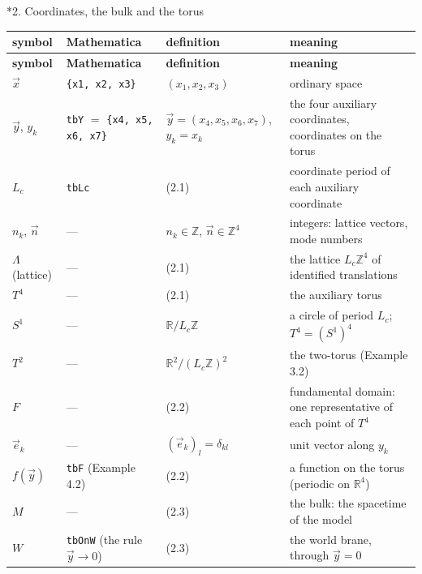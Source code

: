 \documentclass[10pt,a4paper]{article}
\makeatletter
\renewcommand\section{\@startsection{section}{1}{\z@}{-3.5ex \@plus -1ex \@minus -.2ex}{2.3ex \@plus.2ex}{\normalfont\Large\bfseries\raggedright}}
\makeatother
\begin{document}
\section*{2. Coordinates, the bulk and the torus}
{\small
\begin{longtable}{>{\raggedright\arraybackslash}p{}>{\raggedright\arraybackslash}p{}>{\raggedright\arraybackslash}p{}>{\raggedright\arraybackslash}p{}}
\toprule
\textbf{symbol} & \textbf{Mathematica} & \textbf{definition} & \textbf{meaning} \\
\midrule\endfirsthead
\toprule
\textbf{symbol} & \textbf{Mathematica} & \textbf{definition} & \textbf{meaning} \\
\midrule\endhead
\endfoot
\bottomrule\endlastfoot
$\vec x$ & \texttt{\{x1, x2, x3\}} & $(x_1,x_2,x_3)$ & ordinary space \\
$\vec y$, $y_k$ & \texttt{tbY} $=$ \texttt{\{x4, x5, x6, x7\}} & $\vec y=(x_4,x_5,x_6,x_7)$, $y_k=x_k$ & the four auxiliary coordinates, coordinates on the torus \\
$L_c$ & \texttt{tbLc} & (2.1) & coordinate period of each auxiliary coordinate \\
$n_k$, $\vec n$ & — & $n_k\in\mathbb Z$, $\vec n\in\mathbb Z^4$ & integers: lattice vectors, mode numbers \\
$\Lambda$ (lattice) & — & (2.1) & the lattice $L_c\mathbb Z^4$ of identified translations \\
$T^4$ & — & (2.1) & the auxiliary torus \\
$S^1$ & — & $\mathbb R/L_c\mathbb Z$ & a circle of period $L_c$; $T^4=(S^1)^4$ \\
$T^2$ & — & $\mathbb R^2/(L_c\mathbb Z)^2$ & the two-torus (Example 3.2) \\
$F$ & — & (2.2) & fundamental domain: one representative of each point of $T^4$ \\
$\vec e_k$ & — & $(\vec e_k)_l=\delta_{kl}$ & unit vector along $y_k$ \\
$f(\vec y)$ & \texttt{tbF} (Example 4.2) & (2.2) & a function on the torus (periodic on $\mathbb R^4$) \\
$M$ & — & (2.3) & the bulk: the spacetime of the model \\
$W$ & \texttt{tbOnW} (the rule $\vec y\to0$) & (2.3) & the world brane, through $\vec y=0$ \\

\end{longtable}}
\end{document}
